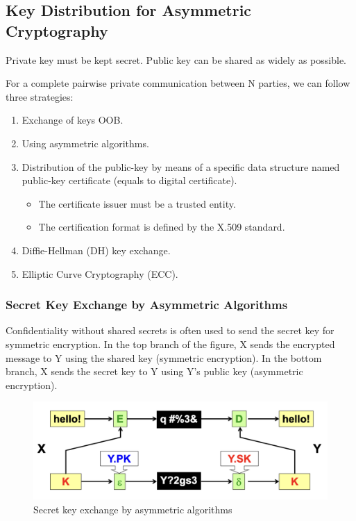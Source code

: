 \subsection{Key Distribution for Asymmetric Cryptography}
\begin{tcolorbox}[colback=red!10!white, colframe=red!70!black, coltitle=white, title=Beware]
Private key must be kept secret. Public key can be shared as widely as possible.
\end{tcolorbox}

\noindent For a complete pairwise private communication between N parties, we can follow three strategies:
\begin{enumerate}
    \item Exchange of keys OOB.
    \item Using asymmetric algorithms.
    \item Distribution of the public-key by means of a specific data structure named public-key certificate (equals to digital certificate).
    \begin{itemize}
        \item The certificate issuer must be a trusted entity.
        \item The certification format is defined by the X.509 standard.
    \end{itemize} 
    \item Diffie-Hellman (DH) key exchange.
    \item Elliptic Curve Cryptography (ECC).
\end{enumerate}

\subsubsection{Secret Key Exchange by Asymmetric Algorithms}
Confidentiality without shared secrets is often used to send the secret key for symmetric encryption. In the top branch of the figure, X sends the encrypted message to Y using the shared key (symmetric encryption). In the bottom branch, X sends the secret key to Y using Y's public key (asymmetric encryption).

\begin{figure}[H]
    \centering
    \includegraphics[width=0.7\linewidth]{Images/Cryptography/pk_exchange.png}
    \caption{Secret key exchange by asymmetric algorithms}
\end{figure}

